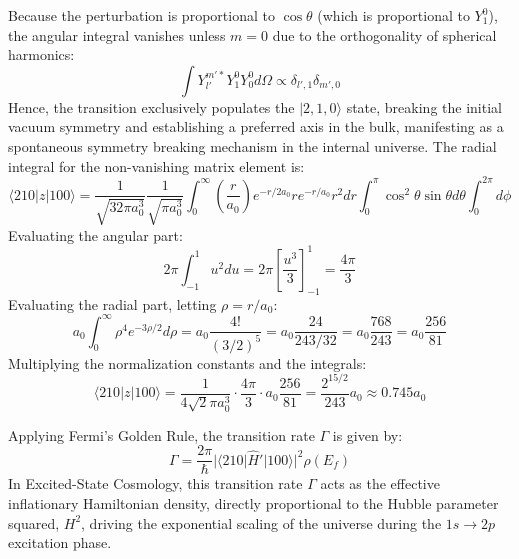 Because the perturbation is proportional to $\cos\theta$ (which is proportional to $Y_1^0$), the angular integral vanishes unless $m=0$ due to the orthogonality of spherical harmonics:
\begin{equation}
\int Y_{l'}^{m'*} Y_1^0 Y_0^0 d\Omega \propto \delta_{l',1} \delta_{m',0}
\end{equation}
Hence, the transition exclusively populates the $|2,1,0\rangle$ state, breaking the initial vacuum symmetry and establishing a preferred axis in the bulk, manifesting as a spontaneous symmetry breaking mechanism in the internal universe. 
The radial integral for the non-vanishing matrix element is:
\begin{equation}
\langle 210 | z | 100 \rangle = \frac{1}{\sqrt{32\pi a_0^3}} \frac{1}{\sqrt{\pi a_0^3}} \int_0^\infty \left(\frac{r}{a_0}\right) e^{-r/2a_0} r e^{-r/a_0} r^2 dr \int_0^\pi \cos^2\theta \sin\theta d\theta \int_0^{2\pi} d\phi
\end{equation}
Evaluating the angular part:
\begin{equation}
2\pi \int_{-1}^1 u^2 du = 2\pi \left[\frac{u^3}{3}\right]_{-1}^1 = \frac{4\pi}{3}
\end{equation}
Evaluating the radial part, letting $\rho = r/a_0$:
\begin{equation}
a_0 \int_0^\infty \rho^4 e^{-3\rho/2} d\rho = a_0 \frac{4!}{(3/2)^5} = a_0 \frac{24}{243/32} = a_0 \frac{768}{243} = a_0 \frac{256}{81}
\end{equation}
Multiplying the normalization constants and the integrals:
\begin{equation}
\langle 210 | z | 100 \rangle = \frac{1}{4\sqrt{2}\pi a_0^3} \cdot \frac{4\pi}{3} \cdot a_0 \frac{256}{81} = \frac{2^{15/2}}{243} a_0 \approx 0.745 a_0
\end{equation}

Applying Fermi's Golden Rule, the transition rate $\Gamma$ is given by:
\begin{equation}
\Gamma = \frac{2\pi}{\hbar} |\langle 210 | \hat{H}' | 100 \rangle|^2 \rho(E_f)
\end{equation}
In Excited-State Cosmology, this transition rate $\Gamma$ acts as the effective inflationary Hamiltonian density, directly proportional to the Hubble parameter squared, $H^2$, driving the exponential scaling of the universe during the $1s \rightarrow 2p$ excitation phase.

